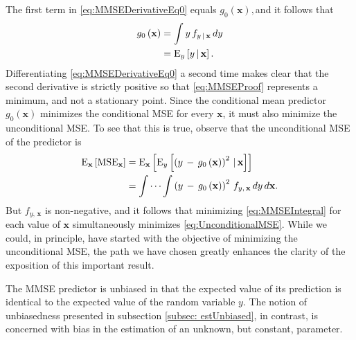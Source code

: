 \documentclass[graybox,envcountchap,sectrefs]{svmono}\usepackage[]{graphicx}\usepackage[]{xcolor}
\begin{document}
\begin{appendices}
The first term in \eqref{eq:MMSEDerivativeEq0} equals $g_{0}\left(\mathrm{\mathbf{x}}\right),$and
it follows that
\begin{align}
g_{0}\left(\mathrm{\mathbf{x}}\right) & =\intop y\,f_{y\,|\,\mathrm{\mathbf{x}}}\,dy\nonumber \\
 & =\mathrm{E}_{y}\left[y\,|\,\mathrm{\mathbf{x}}\right].\label{eq:MMSEProof}
\end{align}
Differentiating \eqref{eq:MMSEDerivativeEq0} a second time makes
clear that the second derivative is strictly positive so that \eqref{eq:MMSEProof}
represents a minimum, and not a stationary point. Since the conditional
mean predictor $g_{0}\left(\mathrm{\mathbf{x}}\right)$ minimizes
the conditional MSE for every $\mathbf{x}$, it must also minimize
the unconditional MSE. To see that this is true, observe that the
unconditional MSE of the predictor is  
\begin{align}
\mathrm{E}_{\mathbf{x}}\left[{\mathrm{MSE}}_{\mathrm{\mathbf{x}}}\right] & =\mathrm{E}_{\mathbf{x}}\left[\mathrm{E}_{y}\left[\left(y\,-\,g_{0}\left(\mathrm{\mathbf{x}}\right)\right)^{2}\,|\,\mathrm{\mathbf{x}}\right]\right]\nonumber \\
 & =\idotsint\left(y\,-\,g_{0}\left(\mathrm{\mathbf{x}}\right)\right)^{2}\,f_{y,\,\mathrm{\mathbf{x}}}\,dy\,d\mathbf{x}.\label{eq:UnconditionalMSE}
\end{align}
But $f_{y,\,\mathrm{\mathbf{x}}}$ is non-negative, and it follows
that minimizing \eqref{eq:MMSEIntegral} for each value of $\mathrm{\mathbf{x}}$
simultaneously minimizes \eqref{eq:UnconditionalMSE}. While we could,
in principle, have started with the objective of minimizing the unconditional
MSE, the path we have chosen greatly enhances the clarity of the exposition
of this important result.

The MMSE predictor is unbiased in that the expected value of its prediction
is identical to the expected value of the random variable $y$. The
notion of unbiasedness presented in subsection \ref{subsec: estUnbiased},
in contrast, is concerned with bias in the estimation of an unknown,
but constant, parameter.


\end{appendices}
\end{document}

